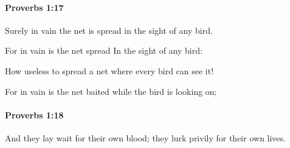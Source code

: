 		\paragraph{Proverbs 1:17} %
			\label{PROVERBS-1-17}

			Surely in vain the net is spread in the sight of any bird.

			\begin{versebox}
					\item[BHS] 
					\item[ASV] For in vain is the net spread In the sight of any bird:
					\item[NIV] How useless to spread a net where every bird can see it!
					\item[NRSV] For in vain is the net baited while the bird is looking on;
			\end{versebox}

		\paragraph{Proverbs 1:18} %
			\label{PROVERBS-1-18}

			And they lay wait for their own blood; they lurk privily for their own lives.

